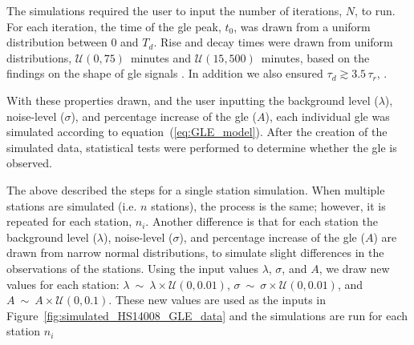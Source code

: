 The simulations required the user to input the number of iterations, $N$, to run. For each iteration, the time of the \gls{gle} peak, $t_0$, was drawn from a uniform distribution between 0 and $T_d$. Rise and decay times were drawn from uniform distributions, $\mathcal{U}(0, 75)$~minutes and $\mathcal{U}(15, 500)$~minutes, based on the findings on the shape of \gls{gle} signals \citep{strauss_pulse_2017}. In addition we also ensured $\tau_d \gtrsim 3.5 \, \tau_r$, \citep{strauss_pulse_2017}.

With these properties drawn, and the user inputting the background level ($\lambda$), noise-level ($\sigma$), and percentage increase of the \gls{gle} ($A$), each individual \gls{gle} was simulated according to equation~(\ref{eq:GLE_model}). After the creation of the simulated data, statistical tests were performed to determine whether the \gls{gle} is observed.

The above described the steps for a single station simulation. When multiple stations are simulated (i.e. $n$ stations), the process is the same; however, it is repeated for each station, $n_i$. Another difference is that for each station the background level ($\lambda$), noise-level ($\sigma$), and percentage increase of the \gls{gle} ($A$) are drawn from narrow normal distributions, to simulate slight differences in the observations of the stations. Using the input values $\lambda$, $\sigma$, and $A$, we draw new values for each station: $\lambda~\sim~\lambda\times\mathcal{U}(0, 0.01)$, $\sigma~\sim~\sigma\times\mathcal{U}(0, 0.01)$, and $A~\sim~A\times\mathcal{U}(0, 0.1)$. These new values are used as the inputs in Figure~\ref{fig:simulated_HS14008_GLE_data} and the simulations are run for each station $n_i$

%
%
%
